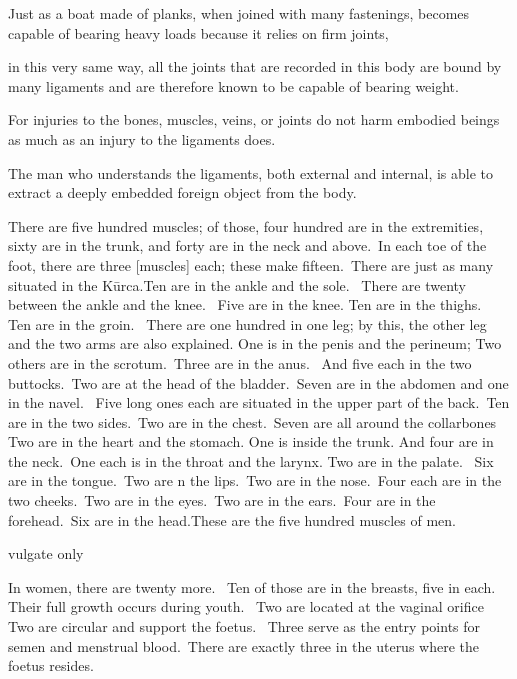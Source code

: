 \begin{translation}
\begin{tt}
\item[33]
Just as a boat made of planks, when joined with many fastenings, becomes capable of bearing heavy loads because it relies on firm joints, 

\item[34]
in this very same way, all the joints that are recorded in this body are bound by many ligaments and are therefore known to be capable of bearing weight. 


\item[35]
For injuries to the bones, muscles, veins, or joints do not harm embodied beings as much as an injury to the ligaments does. 

\item[36]
The man who understands the ligaments, both external and internal, is able to extract a deeply embedded foreign object from the body. 

\item[37]
There are five hundred muscles; of those, four hundred are in the extremities, sixty are in the trunk, and forty are in the neck and above. In each toe of the foot, there are three [muscles] each; these make fifteen. There are just as many situated in the Kūrca.Ten are in the ankle and the sole.  There are twenty between the ankle and the knee.  Five are in the knee. Ten are in the thighs.  Ten are in the groin.  There are one hundred in one leg; by this, the other leg and the two arms are also explained. One is in the penis and the perineum; Two others are in the scrotum. Three are in the anus.  And five each in the two buttocks. Two are at the head of the bladder. Seven are in the abdomen and one in the navel.  Five long ones each are situated in the upper part of the back. Ten are in the two sides. Two are in the chest. Seven are all around the collarbones Two are in the heart and the stomach. One is inside the trunk. And four are in the neck. One each is in the throat and the larynx. Two are in the palate.  Six are in the tongue. Two are  n the lips. Two are in the nose. Four each are in the two cheeks. Two are in the eyes. Two are in the ears. Four are in the forehead. Six are in the head.These are the five hundred muscles of men. 

\item[38]  vulgate only

\item[39]
In women, there are twenty more.  Ten of those are in the breasts, five in each. 
Their full growth occurs during youth.  Two are located at the vaginal orifice
Two are circular and support the foetus.  Three serve as the entry points for semen and menstrual blood. There are exactly three in the uterus where the foetus resides. 


\end{tt}
\end{translation}
